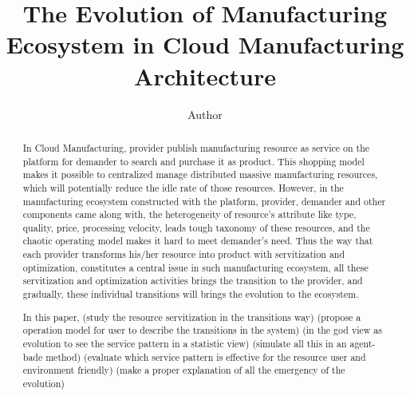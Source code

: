 
\title{The Evolution of Manufacturing Ecosystem in Cloud Manufacturing Architecture
}

\author[label1]{Author}
\address[label1]{ZJU}
\begin{abstract}
In Cloud Manufacturing, provider publish manufacturing resource as service on the platform for demander to search and purchase it as product. This shopping model makes it possible to centralized manage distributed massive manufacturing resources, which will potentially reduce the idle rate of those resources.
However, in the manufacturing ecosystem constructed with the platform, provider, demander and other components came along with, the heterogeneity of resource's attribute like type, quality, price, processing velocity, leads tough taxonomy of these resources, and the chaotic operating model makes it hard to meet demander's need.
Thus the way that each provider transforms his/her resource into product with servitization and optimization, constitutes a central issue in such manufacturing ecosystem, all these servitization and optimization activities brings the transition to the provider, and gradually, these individual transitions will brings the evolution to the ecosystem.

In this paper,
(study the resource servitization in the transitions way)
(propose a operation model for user to describe the transitions in the system) 
(in the god view as evolution to see the service pattern in a statistic view)
(simulate all this in an agent-bade method)
(evaluate which service pattern is effective for the resource user and environment friendly)
(make a proper explanation of all the emergency of the evolution)








\end{abstract}
